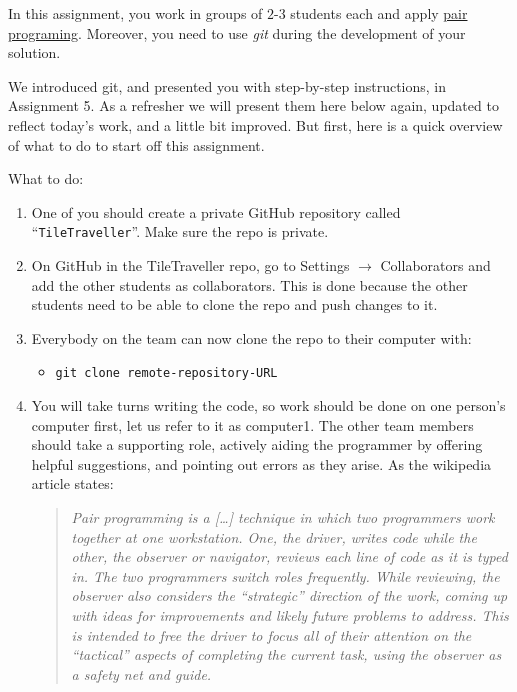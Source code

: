 
In this assignment, you work in groups of $2$-$3$ students each and apply
\href{https://en.wikipedia.org/wiki/Pair_programming}{pair programing}.
Moreover, you need to use \emph{git} during the development of your solution.

We introduced git, and presented you with step-by-step instructions, in Assignment 5.
As a refresher we will present them here below again, updated to reflect today's work, and a little bit improved.
But first, here is a quick overview of what to do to start off this assignment.

What to do:
\begin{enumerate}
    \item
    One of you should create a private GitHub repository called ``\texttt{TileTraveller}''.
    Make sure the repo is private.

    \item
    On GitHub in the TileTraveller repo,
    go to Settings $\rightarrow$ Collaborators
    and add the other students as collaborators.
    This is done because the other students need to be able to clone the repo and push changes to it.

    \item Everybody on the team can now clone the repo to their computer with:
    \begin{itemize}
        \item \texttt{git clone remote-repository-URL}
    \end{itemize}

    \item
    You will take turns writing the code,
    so work should be done on one person's computer first, let us refer to it as computer1.
    The other team members should take a supporting role,
    actively aiding the programmer by offering helpful suggestions, and pointing out errors as they arise.
    As the wikipedia article states:
    \begin{quote}
        \emph{
            Pair programming is a [\dots] technique
            in which two programmers work together at one workstation.
            One, the \emph{driver}, writes code
            while the other, the \emph{observer} or \emph{navigator},
            reviews each line of code as it is typed in.
            The two programmers switch roles frequently.
            While reviewing, the observer also considers the ``strategic'' direction of the work,
            coming up with ideas for improvements and likely future problems to address.
            This is intended to free the driver
            to focus all of their attention on the ``tactical'' aspects of completing the current task,
            using the observer as a safety net and guide.
        }
    \end{quote}


\end{enumerate}
